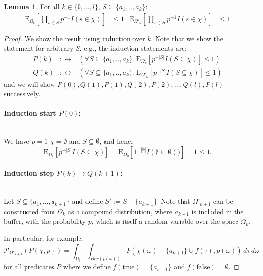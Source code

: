 \documentclass{article}
\newcommand{\prob}{\mathcal P}
\newcommand{\expectation}{\mathrm{E}}
\theoremstyle{definition}
\newtheorem{lemma}{Lemma}
\begin{document}
\begin{lemma}
\label{le:neg_cor}
For all $k \in \{0,\ldots,l\}$, $S \subseteq \{a_1,..,a_k\}$:
\begin{align*}
  \expectation_{\Omega_k}\left[ \prod_{s \in S} p^{-1} I(s \in \chi) \right] & \leq 1 & 
  \expectation_{\Omega'_k}\left[ \prod_{s \in S} p^{-1} I(s \in \chi) \right] & \leq 1
\end{align*}
\end{lemma}
\begin{proof}
We show the result using induction over $k$. Note that we show the statement for arbitrary $S$, e.g., the induction statements are:
\begin{eqnarray*}
P(k) & :\leftrightarrow & \left(\forall S \subseteq \{a_1,..,a_k\}. \; \expectation_{\Omega_k}\left[p^{-|S|} I(S \subseteq \chi)\right] \leq 1\right) \\
Q(k) & :\leftrightarrow & \left(\forall S \subseteq \{a_1,..,a_k\}. \; \expectation_{\Omega'_k}\left[p^{-|S|} I(S \subseteq \chi)\right] \leq 1\right)
\end{eqnarray*}
and we will show $P(0),Q(1),P(1),Q(2),P(2),\ldots,Q(l),P(l)$ successively.
\paragraph{Induction start $P(0)$:} \phantom{.}\\
We have $p=1$ $\chi=\emptyset$ and $S \subseteq \emptyset$, and hence
\[
\expectation_{\Omega_0}\left[p^{-|S|} I(S \subseteq \chi)\right] = \expectation_{\Omega_0}\left[1^{-|\emptyset|} I(\emptyset \subseteq \emptyset))\right] = 1 \leq 1 \textrm{.}
\]
\paragraph{Induction step $P(k) \rightarrow Q(k+1)$:} \phantom{.}\\
Let $S \subseteq \{ a_1, \ldots, a_{k+1} \}$ and define $S' := S - \{ a_{k+1} \}$.
Note that $\Omega’_{k+1}$ can be constructed from $\Omega_k$ as a compound distribution, where $a_{k+1}$ is included in the buffer, with the probability $p$, which is itself a random variable over the space $\Omega_k$.

In particular, for example:
\[
\prob_{\Omega'_{k+1}}( P(\chi, p) ) = \int_{\Omega_k} \int_{Ber(p(\omega))} P(\chi(\omega)-\{a_{k+1}\}\cup f(\tau), p(\omega)) \, d \tau \, d \omega  
\]
for all predicates $P$ where we define $f(\mathrm{true}) = \{a_{k+1}\}$ and $f(\mathrm{false}) = \emptyset$.


\end{proof}
\end{document}
